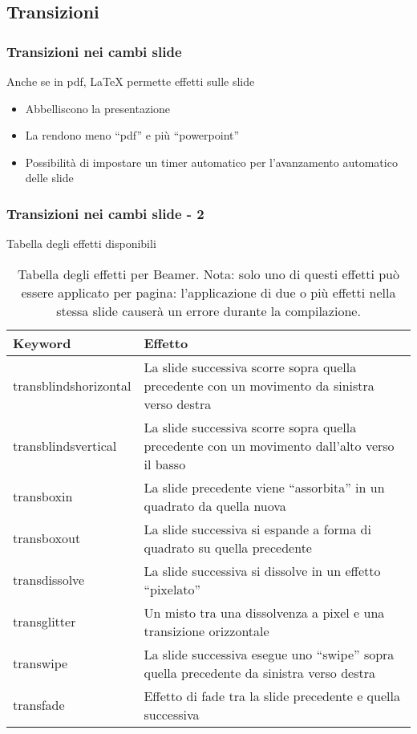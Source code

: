 \subsection{Transizioni} 
\begin{frame}
  \frametitle{Transizioni nei cambi slide}
  
  Anche se in pdf, \LaTeX{} permette effetti sulle slide
  \begin{itemize}
    \item Abbelliscono la presentazione
    \item La rendono meno ``pdf'' e più ``powerpoint''
    \item Possibilità di impostare un timer automatico per l'avanzamento 
automatico delle slide
  \end{itemize}

\end{frame}

\begin{frame}
  \frametitle{Transizioni nei cambi slide - 2}
  
  Tabella degli effetti disponibili
 
\begin{table}[t]
\centering
\begin{tabular}{|l|l|}
\hline
\textbf{Keyword}       & \textbf{Effetto}           \\ \hline
transblindshorizontal & La slide successiva scorre sopra quella
precedente con un movimento da sinistra verso destra \\ \hline
transblindsvertical   & La slide successiva scorre sopra quella
precedente con un movimento dall'alto verso il basso \\ \hline
transboxin            & La slide precedente viene ``assorbita'' in un
quadrato da quella nuova                       \\ \hline
transboxout           & La slide successiva si espande a forma di
quadrato su quella precedente                      \\ \hline
transdissolve         & La slide successiva si dissolve in un effetto
``pixelato''                                   \\ \hline
transglitter          & Un misto tra una dissolvenza a pixel e una
transizione orizzontale                           \\ \hline
transwipe             & La slide successiva esegue uno ``swipe'' sopra
quella precedente da sinistra verso destra    \\ \hline
transfade             & Effetto di fade tra la slide precedente e
quella successiva                                  \\ \hline
\end{tabular}
\caption[Tabella degli effetti Beamer]{Tabella degli effetti per Beamer. Nota:
solo uno di questi effetti può essere applicato per pagina: l'applicazione di
due o più effetti nella stessa slide causerà un errore durante la compilazione.}
\label{tab:beamer_effects}
\end{table}
\end{frame}

